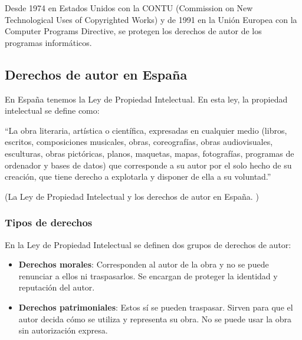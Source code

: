             Desde 1974 en Estados Unidos con la CONTU\cite{contu} (Commission on New Technological Uses of Copyrighted
            Works) y de 1991 en la Unión Europea con la Computer Programs Directive\cite{com_pro_dir}, se protegen los
            derechos de autor de los programas informáticos.


        \subsection{Derechos de autor en España} %
        \label{sub:DerechosDeAutorEnEspana}

            En España tenemos la Ley de Propiedad Intelectual. En esta ley, la propiedad intelectual se define como:

            ``La obra literaria, artística o científica, expresadas en cualquier medio (libros, escritos, composiciones
            musicales, obras, coreografías, obras audiovisuales, esculturas, obras pictóricas, planos, maquetas, mapas,
            fotografías, programas de ordenador y bases de datos) que corresponde a su autor por el solo hecho de su
            creación, que tiene derecho a explotarla y disponer de ella a su voluntad.''

            \begin{flushright}
                (La Ley de Propiedad Intelectual y los derechos de autor en España. \cite{propiedad_intelectual_espana})
            \end{flushright}

            \subsubsection{Tipos de derechos} %
            \label{ssub:TiposDeDerechos}

                En la Ley de Propiedad Intelectual se definen dos grupos de derechos de autor:

                \begin{itemize}
                    \item \textbf{Derechos morales}: Corresponden al autor de la obra y no se puede renunciar a ellos ni
                    traspasarlos. Se encargan de proteger la identidad y reputación del autor.
                    \item \textbf{Derechos patrimoniales}: Estos sí se pueden traspasar. Sirven para que el autor decida
                    cómo se utiliza y representa su obra. No se puede usar la obra sin autorización expresa.
                \end{itemize}
            
